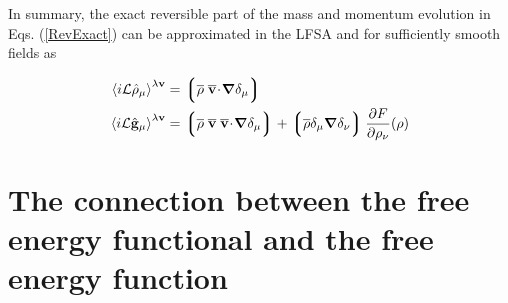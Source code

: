 \documentclass[b5paper,openright,11pt]{book}
\newcommand{\esc}{\!\cdot\!}
\newcommand{\llangle}{\left\langle}
\newcommand{\rrangle}{\right\rangle}
\newcommand{\llg}{\left\lgroup}
\newcommand{\rlg}{\right\rgroup}
\begin{document}
\begin{appendices}
In  summary,  the exact  reversible  part  of  the mass  and  momentum
evolution in Eqs. (\ref{RevExact}) can be approximated in the LFSA and
for sufficiently smooth fields as

\begin{align}
  \llangle i{\cal L}\hat{\rho}_\mu\rrangle^{\lambda{\bf v}} &=
\llg \overline{\rho}\;\overline{\bf v}\esc\boldsymbol{\nabla}\delta_{\mu}\rlg
\nonumber\\
  \llangle i{\cal L}\hat{\bf g}_\mu\rrangle^{\lambda{\bf v}} &=
\llg\overline{\rho}\;
\overline{\bf v}\;\overline{\bf v}\esc\boldsymbol{\nabla}\delta_{\mu}\rlg
+\llg\overline{\rho}\delta_{\mu}\boldsymbol{\nabla}\delta_{\nu}\rlg
\frac{\partial  F}{\partial \rho_{\nu}}(\rho)
\label{RevApprox}
\end{align}

\section{The connection between the  free energy functional and the
  free energy function}
\label{Ap:free}


\end{appendices}
\end{document}
